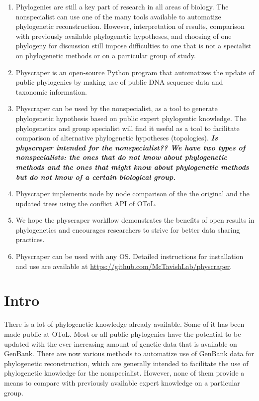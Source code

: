 \documentclass[10pt,a4paper,onecolumn]{article}
\begin{document}
\begin{enumerate}
\def\labelenumi{\arabic{enumi}.}
\item
  Phylogenies are still a key part of research in all areas of biology.
  The nonspecialist can use one of the many tools available to
  automatize phylogenetic reconstruction. However, interpretation of
  results, comparison with previously available phylogenetic hypotheses,
  and choosing of one phylogeny for discussion still impose difficulties
  to one that is not a specialist on phylogenetic methods or on a
  particular group of study.
\item
  Physcraper is an open‐source Python program that automatizes the
  update of public phylogenies by making use of public DNA sequence data
  and taxonomic information.
\item
  Physcraper can be used by the nonspecialist, as a tool to generate
  phylogenetic hypothesis based on public expert phylogentic knowledge.
  The phylogenetics and group specialist will find it useful as a tool
  to facilitate comparison of alternative phylogenetic hypotheses
  (topologies). \textbf{\emph{Is physcraper intended for the
  nonspecialist?? We have two types of nonspecialists: the ones that do
  not know about phylogenetic methods and the ones that might know about
  phylogenetic methods but do not know of a certain biological group.}}
\item
  Physcraper implements node by node comparison of the the original and
  the updated trees using the conflict API of OToL.
\item
  We hope the physcraper workflow demonstrates the benefits of open
  results in phylogenetics and encourages researchers to strive for
  better data sharing practices.
\item
  Physcraper can be used with any OS. Detailed instructions for
  installation and use are available at
  \url{https://github.com/McTavishLab/physcraper}.
\end{enumerate}

\hypertarget{intro}{%
\section{Intro}\label{intro}}

There is a lot of phylogenetic knowledge already available. Some of it
has been made public at OToL. Most or all public phylogenies have the
potential to be updated with the ever increasing amount of genetic data
that is available on GenBank. There are now various methods to
automatize use of GenBank data for phylogenetic reconstruction, which
are generally intended to facilitate the use of phylogenetic knowledge
for the nonspecialist. However, none of them provide a means to compare
with previously available expert knowledge on a particular group.
\end{document}
